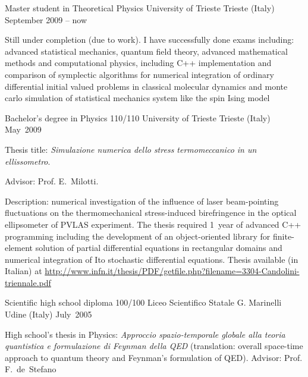 
\begin{cventries}
\cventry
{Master student in Theoretical Physics}
{University of Trieste}
{Trieste (Italy)}
{September 2009 -- now}%
{%
      \begin{cvitems}
      \item{%
   Still  under completion (due to work). I have successfully done  exams including: advanced statistical mechanics,
   quantum field theory, advanced mathematical methods and computational physics,
   including C++
   implementation and comparison of symplectic algorithms for numerical
   integration of ordinary differential initial valued problems in classical
   molecular dynamics and monte carlo simulation of statistical mechanics
   system like the spin Ising model
}
\end{cvitems}
}


\cventry
{Bachelor's degree in Physics 110/110}
{University of Trieste}
{Trieste (Italy)}
{May~2009}
{%
      \begin{cvitems}
      \item{%
   Thesis title: \emph{Simulazione numerica dello stress termomeccanico in un
      ellissometro}.
}
\item{%
   Advisor: Prof. E.~Milotti.
}
\item{%
   Description:
numerical investigation of the influence of laser beam-pointing fluctuations 
on the
   thermomechanical stress-induced birefringence in the optical
   ellipsometer of PVLAS experiment. The thesis required 1~year of advanced C++ programming
   including the development of an object-oriented library for finite-element
   solution of partial differential equations 
   in rectangular domains and numerical integration of Ito stochastic differential
   equations.
Thesis available (in Italian) at 
\url{http://www.infn.it/thesis/PDF/getfile.php?filename=3304-Candolini-triennale.pdf}
}
\end{cvitems}
}
    

\cventry
{Scientific high school diploma 100/100} 
{Liceo Scientifico Statale G. Marinelli}
{Udine (Italy)}
{July~2005}
{%
      \begin{cvitems}
      \item{%
   High school's thesis in Physics: \emph{Approccio spazio-temporale globale alla
      teoria quantistica e formulazione di Feynman della QED} (translation:
   overall space-time approach to quantum theory and Feynman's formulation of
   QED). Advisor: Prof.
   F.~de~Stefano
}
\end{cvitems}
}
 


\end{cventries}
